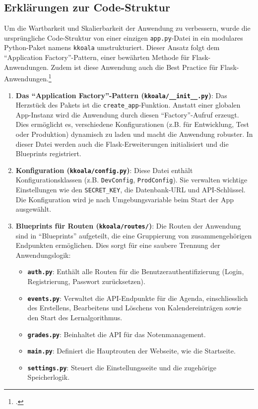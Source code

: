 \documentclass[12pt,a4paper]{report}
\begin{document}
\subsection{Erklärungen zur Code-Struktur}
Um die Wartbarkeit und Skalierbarkeit der Anwendung zu verbessern, wurde die ursprüngliche Code-Struktur von einer einzigen \texttt{app.py}-Datei in ein modulares Python-Paket namens \texttt{kkoala} umstrukturiert. Dieser Ansatz folgt dem \enquote{Application Factory}-Pattern, einer bewährten Methode für Flask-Anwendungen. Zudem ist diese Anwendung auch die Best Practice für Flask-Anwendungen.\footcite{flask_structure_best_practices}

\begin{enumerate}
    \item \textbf{Das \enquote{Application Factory}-Pattern (\texttt{kkoala/\_\_init\_\_.py})}:
    Das Herzstück des Pakets ist die \texttt{create\_app}-Funktion. Anstatt einer globalen App-Instanz wird die Anwendung durch diesen \enquote{Factory}-Aufruf erzeugt. Dies ermöglicht es, verschiedene Konfigurationen (z.B. für Entwicklung, Test oder Produktion) dynamisch zu laden und macht die Anwendung robuster. In dieser Datei werden auch die Flask-Erweiterungen initialisiert und die Blueprints registriert.

    \item \textbf{Konfiguration (\texttt{kkoala/config.py})}:
    Diese Datei enthält Konfigurationsklassen (z.B. \texttt{DevConfig}, \texttt{ProdConfig}). Sie verwalten wichtige Einstellungen wie den \texttt{SECRET\_KEY}, die Datenbank-URL und API-Schlüssel. Die Konfiguration wird je nach Umgebungsvariable beim Start der App ausgewählt.

    \item \textbf{Blueprints für Routen (\texttt{kkoala/routes/})}:
    Die Routen der Anwendung sind in \enquote{Blueprints} aufgeteilt, die eine Gruppierung von zusammengehörigen Endpunkten ermöglichen. Dies sorgt für eine saubere Trennung der Anwendungslogik:
    \begin{itemize}
        \item \textbf{\texttt{auth.py}}: Enthält alle Routen für die Benutzerauthentifizierung (Login, Registrierung, Passwort zurücksetzen).
        \item \textbf{\texttt{events.py}}: Verwaltet die API-Endpunkte für die Agenda, einschliesslich des Erstellens, Bearbeitens und Löschens von Kalendereinträgen sowie den Start des Lernalgorithmus.
        \item \textbf{\texttt{grades.py}}: Beinhaltet die API für das Notenmanagement.
        \item \textbf{\texttt{main.py}}: Definiert die Hauptrouten der Webseite, wie die Startseite.
        \item \textbf{\texttt{settings.py}}: Steuert die Einstellungsseite und die zugehörige Speicherlogik.
    \end{itemize}


\end{enumerate}
\end{document}
